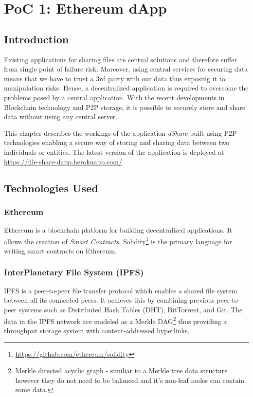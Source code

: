 \chapter{PoC 1: Ethereum dApp}\label{chapter:poc1}

\section{Introduction}
Existing applications for sharing files are central solutions and therefore suffer from single point of failure risk. Moreover, using central services for securing data means that we have to trust a 3rd party with our data thus exposing it to manipulation risks. Hence, a decentralized
application is required to overcome the problems posed by a central application. With the recent developments in Blockchain technology and P2P storage, it is possible to securely store and share data without using any central server.

This chapter describes the workings of the application \textit{dShare}\cite{harsh_kedia_2019_3359852} built using P2P technologies enabling a secure way of storing and sharing data between two individuals or entities. The latest version of the application is deployed at \url{https://file-share-dapp.herokuapp.com/}

\section{Technologies Used}

\subsection{Ethereum}
Ethereum\cite{buterin2014ethereum} is a blockchain platform for building decentralized applications. It allows the creation of \textit{Smart Contracts}. Solidity\footnote{\url{https://github.com/ethereum/solidity}} is the primary language for writing smart contracts on Ethereum.

\subsection{InterPlanetary File System (IPFS)}
IPFS\cite{benet2014ipfs} is a peer-to-peer file transfer protocol which enables a shared file system between all its connected peers. It achieves this by combining previous peer-to-peer systems such as Distributed Hash Tables (DHT), BitTorrent\cite{cohen2008bittorrent}, and Git\cite{loeliger2012version}. The data in the IPFS network are modeled as a Merkle DAG\footnote{Merkle directed acyclic graph - similiar to a Merkle tree data structure however they do not need to be balanced and it’s non-leaf nodes can contain some data.} thus providing a throughput storage system with content-addressed hyperlinks.

